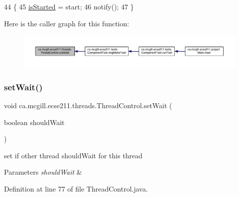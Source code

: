 \begin{DoxyCode}
44                                                    \{
45     \hyperlink{classca_1_1mcgill_1_1ecse211_1_1threads_1_1_thread_control_a92f4933511db42476e39956246bcf2fe}{isStarted} = start;
46     notify();
47   \}
\end{DoxyCode}
Here is the caller graph for this function\+:
\nopagebreak
\begin{figure}[H]
\begin{center}
\leavevmode
\includegraphics[width=350pt]{classca_1_1mcgill_1_1ecse211_1_1threads_1_1_thread_control_a16221cdc4ccf637b190934549c708e1f_icgraph}
\end{center}
\end{figure}
\mbox{\label{classca_1_1mcgill_1_1ecse211_1_1threads_1_1_thread_control_a7759a6f52b56e15cb37cd25ea31c93c1}} 
\subsubsection{\texorpdfstring{set\+Wait()}{setWait()}}
{\footnotesize\ttfamily void ca.\+mcgill.\+ecse211.\+threads.\+Thread\+Control.\+set\+Wait (\begin{DoxyParamCaption}\item[{boolean}]{should\+Wait }\end{DoxyParamCaption})}

set if other thread should\+Wait for this thread 
\begin{DoxyParams}{Parameters}
{\em should\+Wait} & \\
\hline
\end{DoxyParams}


Definition at line 77 of file Thread\+Control.\+java.



